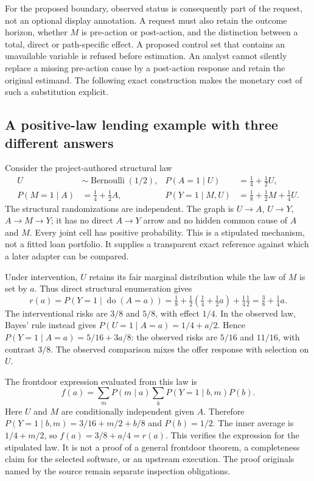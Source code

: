 For the proposed boundary, observed status is consequently part of the request,
not an optional display annotation. A request must also retain the outcome
horizon, whether $M$ is pre-action or post-action, and the distinction between a
total, direct or path-specific effect. A proposed control set that contains an
unavailable variable is refused before estimation. An analyst cannot silently
replace a missing pre-action cause by a post-action response and retain the
original estimand. The following exact construction makes the monetary cost of
such a substitution explicit.\citep{exec19_otherid_reference}

\subsection{A positive-law lending example with three different answers}
\label{exec19:otherid-law}
Consider the project-authored structural law
\begin{align}
 U&\sim\operatorname{Bernoulli}(1/2), &
 P(A=1\mid U)&=\tfrac14+\tfrac12U,\nonumber\\
 P(M=1\mid A)&=\tfrac14+\tfrac12A, &
 P(Y=1\mid M,U)&=\tfrac18+\tfrac12M+\tfrac14U.
 \label{exec19:otherid-structural}
\end{align}
The structural randomizations are independent. The graph is
$U\to A$, $U\to Y$, $A\to M\to Y$; it has no direct $A\to Y$ arrow
and no hidden common cause of $A$ and $M$. Every joint cell has positive
probability. This is a stipulated mechanism, not a fitted loan portfolio.
It supplies a transparent exact reference against which a later adapter can
be compared.\citep{exec19_otherid_reference}

Under intervention, $U$ retains its fair marginal distribution while the law
of $M$ is set by $a$. Thus direct structural enumeration gives
\begin{equation}
 r(a)=P(Y=1\mid\operatorname{do}(A=a))
 =\tfrac18+\tfrac12(\tfrac14+\tfrac12a)+\tfrac14\tfrac12
 =\tfrac38+\tfrac14a.
 \label{exec19:otherid-risks}
\end{equation}
The interventional risks are $3/8$ and $5/8$, with effect $1/4$. In the
observed law, Bayes' rule instead gives $P(U=1\mid A=a)=1/4+a/2$. Hence
$P(Y=1\mid A=a)=5/16+3a/8$: the observed risks are $5/16$ and $11/16$,
with contrast $3/8$. The observed comparison mixes the offer response with
selection on $U$.\citep{exec19_otherid_reference}

The frontdoor expression evaluated from this law is
\begin{equation}
 f(a)=\sum_m P(m\mid a)\sum_b P(Y=1\mid b,m)P(b).
 \label{exec19:otherid-frontdoor}
\end{equation}
Here $U$ and $M$ are conditionally independent given $A$. Therefore
$P(Y=1\mid b,m)=3/16+m/2+b/8$ and $P(b)=1/2$. The inner average is
$1/4+m/2$, so $f(a)=3/8+a/4=r(a)$. This verifies the expression for
the stipulated law. It is not a proof of a general frontdoor theorem, a
completeness claim for the selected software, or an upstream execution. The
proof originals named by the source remain separate inspection obligations.
\citep{exec19_otherid_reference,exec19_otherid_julia}

